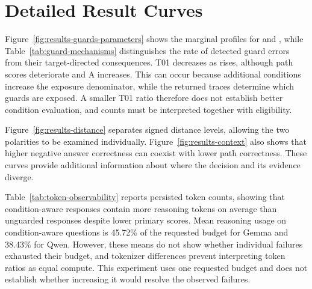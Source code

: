 





\section{Detailed Result Curves}
\label{app:result-details}

Figure~\ref{fig:results-guards-parameters} shows the marginal profiles for  and , while Table~\ref{tab:guard-mechanisms} distinguishes the rate of detected guard errors from their target-directed consequences. T01 decreases as  rises, although path scores deteriorate and A increases. This can occur because additional conditions increase the exposure denominator, while the returned traces determine which guards are exposed. A smaller T01 ratio therefore does not establish better condition evaluation, and counts must be interpreted together with eligibility.

\vspace{0.2cm}

Figure~\ref{fig:results-distance} separates signed distance levels, allowing the two polarities to be examined individually. Figure~\ref{fig:results-context} also shows that higher negative answer correctness can coexist with lower path correctness. These curves provide additional information about where the decision and its evidence diverge.







\vspace{0.2cm}

Table~\ref{tab:token-observability} reports persisted token counts, showing that condition-aware responses contain more reasoning tokens on average than unguarded responses despite lower primary scores. Mean reasoning usage on condition-aware questions is 45.72\% of the requested budget for Gemma and 38.43\% for Qwen. However, these means do not show whether individual failures exhausted their budget, and tokenizer differences prevent interpreting token ratios as equal compute. This experiment uses one requested budget and does not establish whether increasing it would resolve the observed failures.



